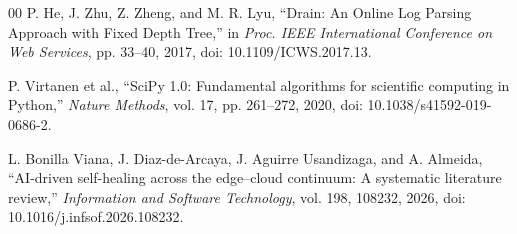 \documentclass[conference]{IEEEtran}
\begin{document}
\begin{thebibliography}{00}
P. He, J. Zhu, Z. Zheng, and M. R. Lyu,
``Drain: An Online Log Parsing Approach with Fixed Depth Tree,''
in \textit{Proc. IEEE International Conference on Web Services},
pp. 33--40, 2017, doi: 10.1109/ICWS.2017.13.

P. Virtanen et al.,
``SciPy 1.0: Fundamental algorithms for scientific computing in Python,''
\textit{Nature Methods}, vol. 17, pp. 261--272, 2020,
doi: 10.1038/s41592-019-0686-2.

L. Bonilla Viana, J. Diaz-de-Arcaya, J. Aguirre Usandizaga, and A. Almeida,
``AI-driven self-healing across the edge--cloud continuum: A systematic
literature review,''
\textit{Information and Software Technology}, vol. 198, 108232, 2026,
doi: 10.1016/j.infsof.2026.108232.

\end{thebibliography}
\end{document}
